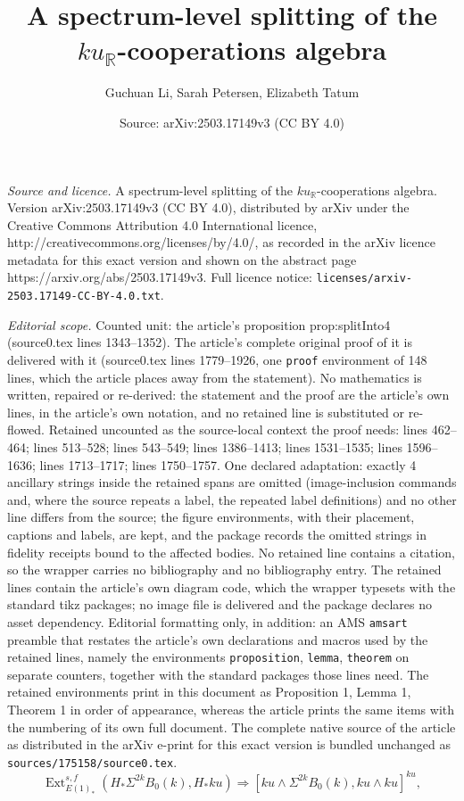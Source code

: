 \documentclass[10pt,a4paper]{amsart}
\title{A spectrum-level splitting of the $ku_\mathbb{R}$-cooperations algebra}
\author{Guchuan Li, Sarah Petersen, Elizabeth Tatum}
\date{Source: arXiv:2503.17149v3 (CC BY 4.0)}
\DeclareMathOperator{\Ext}{Ext}
\begin{document}
\maketitle

\noindent\emph{Source and licence.} A spectrum-level splitting of the $ku_\mathbb{R}$-cooperations algebra. Version arXiv:2503.17149v3 (CC BY 4.0), distributed by arXiv under the Creative Commons Attribution 4.0 International licence, http://creativecommons.org/licenses/by/4.0/, as recorded in the arXiv licence metadata for this exact version and shown on the abstract page https://arxiv.org/abs/2503.17149v3. Full licence notice: \texttt{licenses/arxiv-2503.17149-CC-BY-4.0.txt}.\par\smallskip

\noindent\textit{Editorial scope.} Counted unit: the article's proposition prop:splitInto4 (source0.tex lines 1343--1352). The article's complete original proof of it is delivered with it (source0.tex lines 1779--1926, one \texttt{proof} environment of 148 lines, which the article places away from the statement). No mathematics is written, repaired or re-derived: the statement and the proof are the article's own lines, in the article's own notation, and no retained line is substituted or re-flowed.  Retained uncounted as the source-local context the proof needs: lines 462--464; lines 513--528; lines 543--549; lines 1386--1413; lines 1531--1535; lines 1596--1636; lines 1713--1717; lines 1750--1757.  One declared adaptation: exactly 4 ancillary strings inside the retained spans are omitted (image-inclusion commands and, where the source repeats a label, the repeated label definitions) and no other line differs from the source; the figure environments, with their placement, captions and labels, are kept, and the package records the omitted strings in fidelity receipts bound to the affected bodies.  No retained line contains a citation, so the wrapper carries no bibliography and no bibliography entry.  The retained lines contain the article's own diagram code, which the wrapper typesets with the standard tikz packages; no image file is delivered and the package declares no asset dependency.  Editorial formatting only, in addition: an AMS \texttt{amsart} preamble that restates the article's own declarations and macros used by the retained lines, namely the environments \texttt{proposition}, \texttt{lemma}, \texttt{theorem} on separate counters, together with the standard packages those lines need.  The retained environments print in this document as Proposition 1, Lemma 1, Theorem 1 in order of appearance, whereas the article prints the same items with the numbering of its own full document.  The complete native source of the article as distributed in the arXiv e-print for this exact version is bundled unchanged as \texttt{sources/175158/source0.tex}.
\begin{equation}\label{nonequiv:ass}
     \Ext_{E(1)_{*}}^{s,f} \left(H_{*} \Sigma^{2k} B_{0}(k), H_{*}ku \right) \Longrightarrow [ku \wedge \Sigma^{2k}B_{0}(k), ku \wedge ku]^{ku},
\end{equation}
\end{document}
